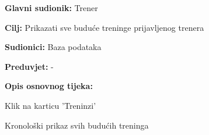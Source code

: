					\noindent {}
					\begin{packed_item}
	
						\item \textbf{Glavni sudionik: }Trener
						\item  \textbf{Cilj: } Prikazati sve buduće treninge prijavljenog trenera
						\item  \textbf{Sudionici: } Baza podataka
						\item  \textbf{Preduvjet: } -
						\item  \textbf{Opis osnovnog tijeka:}
						
						\item[] \begin{packed_enum}
	
							\item Klik na karticu 'Treninzi'
							\item Kronološki prikaz svih budućih treninga 
						\end{packed_enum}
					\end{packed_item}
					
